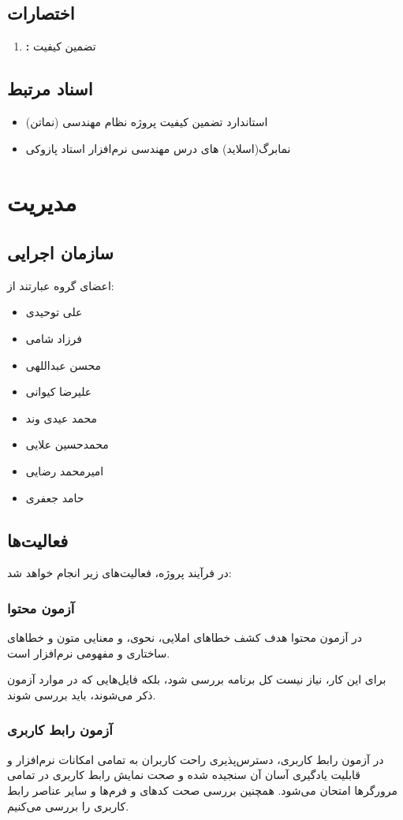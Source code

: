 \documentclass[12pt]{article}
\begin{document}
\subsection{اختصارات}
\begin{enumerate}[ا)]
	\item {} \textbf{:}
	تضمین کیفیت
\end{enumerate}
\subsection{اسناد مرتبط}
\begin{itemize}
	\item استاندارد تضمین کیفیت پروژه نظام مهندسی (نماتن)
	\item نمابرگ(اسلاید) های درس مهندسی نرم‌افزار استاد پازوکی
\end{itemize}
\section{مدیریت}
\subsection{سازمان اجرایی}
اعضای گروه عبارتند از:
\begin{itemize}
	\item علی توحیدی
	\item فرزاد شامی
	\item محسن عبداللهی
	\item علیرضا کیوانی
	\item محمد عیدی وند
	\item محمدحسین علایی
	\item امیرمحمد رضایی
	\item حامد جعفری
\end{itemize}
\subsection{فعالیت‌ها}
در فرآیند  پروژه، فعالیت‌های زیر انجام خواهد شد:
\subsubsection{آزمون محتوا}
در آزمون محتوا هدف کشف خطاهای املایی، نحوی، و معنایی متون و خطاهای ساختاری و مفهومی نرم‌افزار است.

برای این کار، نیاز نیست کل برنامه بررسی شود، بلکه فایل‌هایی که در موارد آزمون ذکر می‌شوند، باید بررسی شوند.
\subsubsection{آزمون رابط کاربری}
در آزمون رابط کاربری، دسترس‌پذیری راحت کاربران به تمامی امکانات نرم‌افزار و قابلیت یادگیری آسان آن سنجیده شده و صحت نمایش رابط کاربری در تمامی مرورگرها امتحان می‌شود. همچنین بررسی صحت کدهای  و فرم‌ها و سایر عناصر رابط کاربری را بررسی می‌کنیم.
\end{document}
